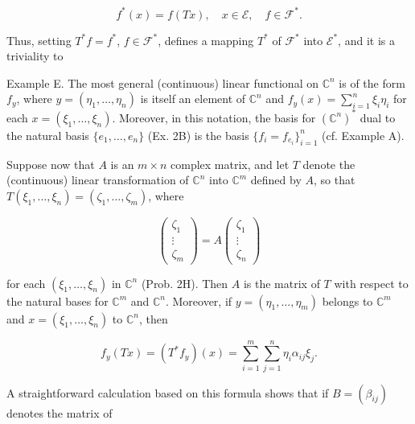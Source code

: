 $$f^*(x) = f(Tx), \quad x \in \mathcal{E}, \quad f \in \mathcal{F}^*.$$

Thus, setting $T^*f = f^*$, $f \in \mathcal{F}^*$, defines a mapping $T^*$ of $\mathcal{F}^*$ into $\mathcal{E}^*$, and it is a triviality to

Example E. The most general (continuous) linear functional on $\mathbb{C}^n$ is of the form $f_y$, where $y = (\eta_1, \ldots, \eta_n)$ is itself an element of $\mathbb{C}^n$ and $f_y(x) = \sum_{i=1}^{n} \xi_i \eta_i$ for each $x = (\xi_1, \ldots, \xi_n)$. Moreover, in this notation, the basis for $(\mathbb{C}^n)^*$ dual to the natural basis $\{e_1, \ldots, e_n\}$ (Ex. 2B) is the basis $\{f_i = f_{e_i}\}_{i=1}^n$ (cf. Example A).

Suppose now that $A$ is an $m \times n$ complex matrix, and let $T$ denote the (continuous) linear transformation of $\mathbb{C}^n$ into $\mathbb{C}^m$ defined by $A$, so that $T(\xi_1, \ldots, \xi_n) = (\zeta_1, \ldots, \zeta_m)$, where

$$\begin{pmatrix}
\zeta_1 \\
\vdots \\
\zeta_m
\end{pmatrix} = A \begin{pmatrix}
\zeta_1 \\
\vdots \\
\zeta_n
\end{pmatrix}$$

for each $(\xi_1, \ldots, \xi_n)$ in $\mathbb{C}^n$ (Prob. 2H). Then $A$ is the matrix of $T$ with respect to the natural bases for $\mathbb{C}^m$ and $\mathbb{C}^n$. Moreover, if $y = (\eta_1, \ldots, \eta_m)$ belongs to $\mathbb{C}^m$ and $x = (\xi_1, \ldots, \xi_n)$ to $\mathbb{C}^n$, then

$$f_y(Tx) = (T^*f_y)(x) = \sum_{i=1}^{m} \sum_{j=1}^{n} \eta_i \alpha_{ij} \xi_j.$$

A straightforward calculation based on this formula shows that if $B = (\beta_{ij})$ denotes the matrix of
